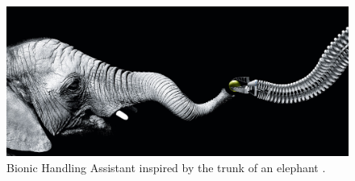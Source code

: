 \begin{figure}[H]
    \centering
    \includegraphics[width = \textwidth]{Figures/BHAelephant.jpg}
    \caption{Bionic Handling Assistant inspired by the trunk of an elephant \cite{BHA}.}
    \label{fig:BHA}
\end{figure}

